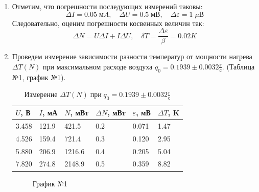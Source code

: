 \documentclass[a4paper,12pt]{article}
\begin{document}
\begin{enumerate}
		\item Отметим, что погрешности последующих измерений таковы:
		$$\Delta I = 0.05\; мA, \quad \Delta U = 0.5 \; мВ, \quad \Delta \varepsilon = 1 \; \mu В$$
		Следовательно, оценим погрешности косвенных величин так: 
		$$\Delta N = U \Delta I + I \Delta U, \quad \delta T = \dfrac{\Delta \varepsilon}{\beta} = 0.02 K$$
		
		\item Проведем измерение зависимости разности температур от мощности нагрева $\Delta T(N)$ при максимальном расходе воздуха $q_0 = 0.1939 \pm 0.0032 \frac{г}{с}$. (Таблица №1, график №1).
		
		\begin{table}[h!] 
			\caption{Измерение $\Delta T (N) \; {при} \; q_0 = 0.1939 \pm 0.0032 \frac{г}{с}$}
			\begin{center}
				\begin{tabular}{|*{6}{l|}}
					\hline
					$U$, В & $I$, мА & $N$, мВт & $\Delta N$, мВт & $\varepsilon$, мВ & $\Delta T$, K\\ \hline
					3.458 & 121.9 & 421.5 & 0.2 & 0.071 & 1.47 \\ \hline
					4.526 & 159.4 & 721.4 & 0.3 & 0.120 & 2.95 \\ \hline
					5.880 & 206.9 & 1216.6 & 0.4 & 0.205 & 5.04 \\ \hline
					7.820 & 274.8 & 2148.9 & 0.5 & 0.359 & 8.82 \\ \hline
				\end{tabular}
			\end{center}
		\end{table}
	
		\begin{figure}[h!]
			\caption[]{\label{fig:3} График №1}
		\end{figure}
	

\end{enumerate}
\end{document}
